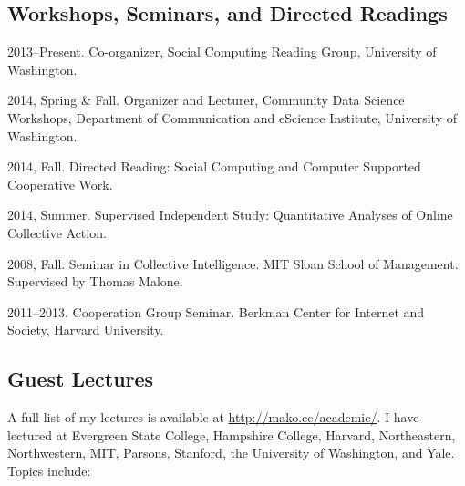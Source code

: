 \documentclass[10pt]{article}
\newenvironment{cvlist}{
\begin{list}{}{\leftmargin=3.0em \itemindent=-3.0em}
  \setlength{\itemsep}{0pt}
  \setlength{\parskip}{0em}
  \setlength{\parsep}{1em}
  \setlength{\parindent}{0em}}
{\vspace{1em}
\end{list}}
\begin{document}
\subsection{Workshops, Seminars, and Directed Readings}
\begin{cvlist}
\item 2013--Present. Co-organizer, Social Computing Reading Group, University of Washington.
\item 2014, Spring \& Fall. Organizer and Lecturer, Community Data Science Workshops, Department of Communication and eScience Institute, University of Washington.
\item 2014, Fall. Directed Reading: Social Computing and Computer Supported Cooperative Work. %
\item 2014, Summer. Supervised Independent Study: Quantitative Analyses of Online Collective Action. %
\item 2008, Fall. Seminar in Collective Intelligence. MIT Sloan School of Management. Supervised by Thomas Malone.
\item 2011--2013. Cooperation Group Seminar. Berkman Center for Internet and Society, Harvard University.
\end{cvlist}

\subsection{Guest Lectures}

A full list of my lectures is available at \url{http://mako.cc/academic/}. I have lectured at Evergreen State College, Hampshire College, Harvard, Northeastern, Northwestern, MIT, Parsons, Stanford, the University of Washington, and Yale. Topics include:
\end{document}

